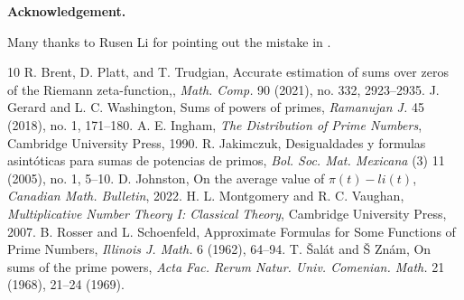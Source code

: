 \documentclass[12pt]{amsart}
\begin{document}
\medskip

\noindent
{\bf Acknowledgement.}

Many thanks to Rusen Li for pointing out the mistake in \cite{GW}.

\begin{thebibliography}{10}
 R. Brent, D. Platt, and T. Trudgian, Accurate estimation of sums over zeros of the Riemann zeta-function,, {\it Math. Comp.} 90 (2021), no. 332, 2923--2935.
 J. Gerard and L. C. Washington, Sums of powers of primes, {\it Ramanujan J.} 45 (2018), no. 1, 171--180.
 A. E. Ingham, {\it The Distribution of Prime Numbers}, Cambridge University Press, 1990.
 R. Jakimczuk,  Desigualdades y formulas asint\'oticas para sumas de potencias de primos, {\it Bol. Soc. Mat. Mexicana} (3) 11 (2005), no. 1, 5–10.
 D. Johnston, On the average value of $\pi(t)-li(t)$, {\it Canadian Math. Bulletin}, 2022.
 H. L. Montgomery and R. C. Vaughan, {\it Multiplicative Number Theory I: Classical Theory}, Cambridge University Press, 2007.
 B. Rosser and L. Schoenfeld,  Approximate Formulas for Some Functions of Prime Numbers, {\it Illinois J. Math.} 6 (1962), 64--94.
 T. \v{S}al\'{a}t and \v{S} Zn\'{a}m, On sums of the prime powers, {\it Acta Fac. Rerum Natur. Univ. Comenian. Math.} 21 (1968), 21–24 (1969).
\end{thebibliography}
\end{document}
